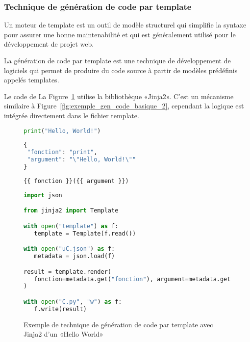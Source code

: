 \subsubsection{Technique de génération de code par template}

Un moteur de template est un outil de modèle structurel qui simplifie la syntaxe pour assurer une bonne maintenabilité et qui est généralement utilisé pour le développement de projet web.

La génération de code par template est une technique de développement de logiciels qui permet de produire du code source à partir de modèles prédéfinis appelés templates.

Le code de La Figure~\ref{fig:exemple_gen_code_basique_template} utilise la bibliothèque «Jinja2». C'est un mécanisme similaire à Figure~\ref{fig:exemple_gen_code_basique_2}, cependant la logique est intégrée directement dans le fichier template.

\begin{figure}
\begin{lstlisting}[language=Python, upquote=true, caption={C - fichier C.py de Figure~\ref{fig:exemple_gen_code_basique_template}}, label={lst:gen_code_template_c}]
print("Hello, World!")
\end{lstlisting}

\begin{lstlisting}[language=Python, upquote=true, caption={µ$_C$ - fichier uC.json de Figure~\ref{fig:exemple_gen_code_basique_template}}, label={lst:gen_code_template_uc}]
{
 "fonction": "print",
 "argument": "\"Hello, World!\""
}
\end{lstlisting}

\begin{lstlisting}[language=Python, upquote=true, caption={template - fichier template de Figure~\ref{fig:exemple_gen_code_basique_template}}, label={lst:gen_code_template_template}]
{{ fonction }}({{ argument }})
\end{lstlisting}

\begin{lstlisting}[language=Python, upquote=true, caption={M(µ$_C$) de Figure~\ref{fig:exemple_gen_code_basique_template}}, label={lst:gen_code_template_m}]
import json

from jinja2 import Template

with open("template") as f:
   template = Template(f.read())

with open("uC.json") as f:
   metadata = json.load(f)

result = template.render(
   fonction=metadata.get("fonction"), argument=metadata.get("argument")
)

with open("C.py", "w") as f:
   f.write(result)
\end{lstlisting}
\caption{Exemple de technique de génération de code par template avec Jinja2 d'un «Hello World»}
\label{fig:exemple_gen_code_basique_template}
\end{figure}


